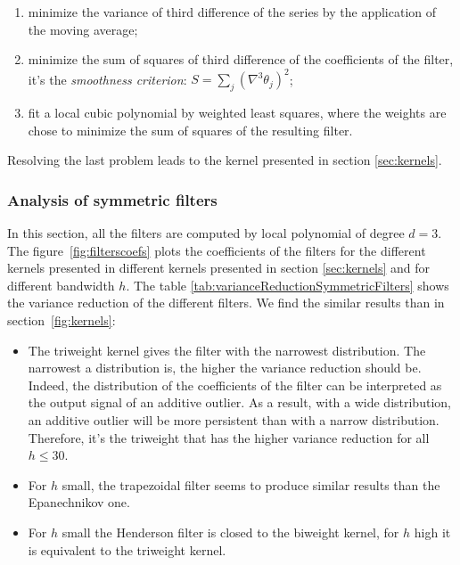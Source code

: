 \documentclass[
  12pt,
  ,
  a4paper]{article}
\providecommand{\tightlist}{%
  \setlength{\itemsep}{0pt}\setlength{\parskip}{0pt}}
\newcommand\1{\mathds{1}}
\begin{document}
\begin{enumerate}
\def\labelenumi{\arabic{enumi}.}
\tightlist
\item
  minimize the variance of third difference of the series by the application of the moving average;\\
\item
  minimize the sum of squares of third difference of the coefficients of the filter, it's the \emph{smoothness criterion}: \(S=\sum_j(\nabla^{3}\theta_{j})^{2}\);\\
\item
  fit a local cubic polynomial by weighted least squares, where the weights are chose to minimize the sum of squares of the resulting filter.
\end{enumerate}

Resolving the last problem leads to the kernel presented in section \ref{sec:kernels}.

\hypertarget{analysis-of-symmetric-filters}{%
\subsubsection{Analysis of symmetric filters}\label{analysis-of-symmetric-filters}}

In this section, all the filters are computed by local polynomial of degree \(d=3\).
The figure~\ref{fig:filterscoefs} plots the coefficients of the filters for the different kernels presented in different kernels presented in section \ref{sec:kernels} and for different bandwidth \(h\).
The table \ref{tab:varianceReductionSymmetricFilters} shows the variance reduction of the different filters.
We find the similar results than in section~\ref{fig:kernels}:

\begin{itemize}
\item
  The triweight kernel gives the filter with the narrowest distribution.
  The narrowest a distribution is, the higher the variance reduction should be.
  Indeed, the distribution of the coefficients of the filter can be interpreted as the output signal of an additive outlier.
  As a result, with a wide distribution, an additive outlier will be more persistent than with a narrow distribution.
  Therefore, it's the triweight that has the higher variance reduction for all \(h\leq30\).
\item
  For \(h\) small, the trapezoidal filter seems to produce similar results than the Epanechnikov one.
\item
  For \(h\) small the Henderson filter is closed to the biweight kernel, for \(h\) high it is equivalent to the triweight kernel.
\end{itemize}
\end{document}
